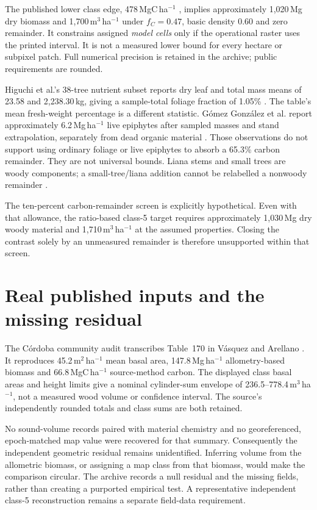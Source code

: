 \documentclass[11pt,a4paper]{article}
\begin{document}
The published lower class edge, 478\,MgC\,ha$^{-1}$ \citep[Table~3]{Arellano2016}, implies approximately 1,020\,Mg dry biomass and 1,700\,m$^3$\,ha$^{-1}$ under $f_C=0.47$, basic density 0.60 and zero remainder. It constrains assigned \emph{model cells} only if the operational raster uses the printed interval. It is not a measured lower bound for every hectare or subpixel patch. Full numerical precision is retained in the archive; public requirements are rounded.

Higuchi et al.'s 38-tree nutrient subset reports dry leaf and total mass means of 23.58 and 2,238.30\,kg, giving a sample-total foliage fraction of 1.05\% \citep[Table~3(b)]{Higuchi1998}. The table's mean fresh-weight percentage is a different statistic. G\'omez Gonz\'alez et al. report approximately 6.2\,Mg\,ha$^{-1}$ live epiphytes after sampled masses and stand extrapolation, separately from dead organic material \citep{Gomez2017}. Those observations do not support using ordinary foliage or live epiphytes to absorb a 65.3\% carbon remainder. They are not universal bounds. Liana stems and small trees are woody components; a small-tree/liana addition cannot be relabelled a nonwoody remainder \citep{Malhi2006}.

The ten-percent carbon-remainder screen is explicitly hypothetical. Even with that allowance, the ratio-based class-5 target requires approximately 1,030\,Mg dry woody material and 1,710\,m$^3$\,ha$^{-1}$ at the assumed properties. Closing the contrast solely by an unmeasured remainder is therefore unsupported within that screen.

\section{Real published inputs and the missing residual}
The C\'ordoba community audit transcribes Table~170 in V\'asquez and Arellano \citep[p.~942]{Vasquez2012}. It reproduces 45.2\,m$^2$\,ha$^{-1}$ mean basal area, 147.8\,Mg\,ha$^{-1}$ allometry-based biomass and 66.8\,MgC\,ha$^{-1}$ source-method carbon. The displayed class basal areas and height limits give a nominal cylinder-sum envelope of 236.5--778.4\,m$^3$\,ha$^{-1}$, not a measured wood volume or confidence interval. The source's independently rounded totals and class sums are both retained.

No sound-volume records paired with material chemistry and no georeferenced, epoch-matched map value were recovered for that summary. Consequently the independent geometric residual remains unidentified. Inferring volume from the allometric biomass, or assigning a map class from that biomass, would make the comparison circular. The archive records a null residual and the missing fields, rather than creating a purported empirical test. A representative independent class-5 reconstruction remains a separate field-data requirement.
\end{document}
